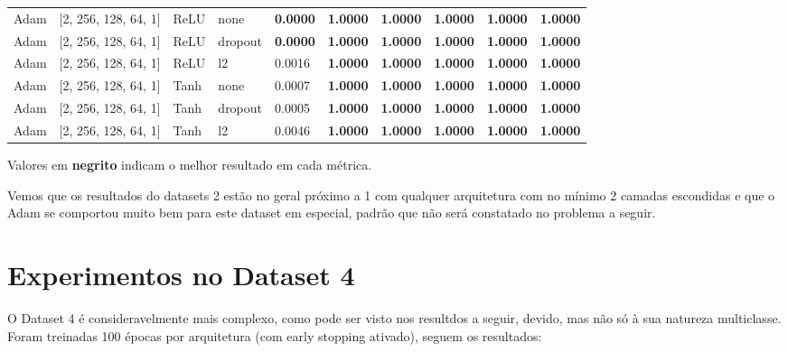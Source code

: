 \documentclass[12pt,a4paper]{article}
\begin{document}
\begin{table}[h]
\begin{tabular}{llllllllll}
Adam & [2, 256, 128, 64, 1] & ReLU & none & \textbf{0.0000} & \textbf{1.0000} & \textbf{1.0000} & \textbf{1.0000} & \textbf{1.0000} & \textbf{1.0000} \\
Adam & [2, 256, 128, 64, 1] & ReLU & dropout & \textbf{0.0000} & \textbf{1.0000} & \textbf{1.0000} & \textbf{1.0000} & \textbf{1.0000} & \textbf{1.0000} \\
Adam & [2, 256, 128, 64, 1] & ReLU & l2 & 0.0016 & \textbf{1.0000} & \textbf{1.0000} & \textbf{1.0000} & \textbf{1.0000} & \textbf{1.0000} \\
Adam & [2, 256, 128, 64, 1] & Tanh & none & 0.0007 & \textbf{1.0000} & \textbf{1.0000} & \textbf{1.0000} & \textbf{1.0000} & \textbf{1.0000} \\
Adam & [2, 256, 128, 64, 1] & Tanh & dropout & 0.0005 & \textbf{1.0000} & \textbf{1.0000} & \textbf{1.0000} & \textbf{1.0000} & \textbf{1.0000} \\
Adam & [2, 256, 128, 64, 1] & Tanh & l2 & 0.0046 & \textbf{1.0000} & \textbf{1.0000} & \textbf{1.0000} & \textbf{1.0000} & \textbf{1.0000} \\
\bottomrule
\end{tabular}
\begin{tablenotes}
  \footnotesize
  \item Valores em \textbf{negrito} indicam o melhor resultado em cada métrica.
\end{tablenotes}
\end{table}


Vemos que os resultados do datasets 2 estão no geral próximo a 1 com qualquer arquitetura com no mínimo 2 camadas escondidas e que o Adam se comportou muito bem para este dataset em especial, padrão que não será constatado no problema a seguir.

\section{Experimentos no Dataset 4}

O Dataset 4 é consideravelmente mais complexo, como pode ser visto nos resultdos a seguir, devido, mas não só à sua natureza multiclasse. Foram treinadas 100 épocas por arquitetura (com early stopping ativado), seguem os resultados:
\end{document}
